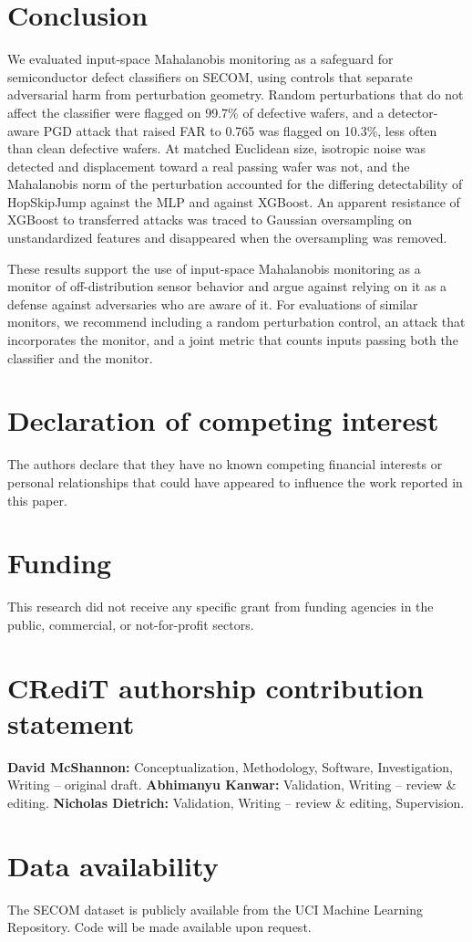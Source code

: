 \documentclass[preprint,12pt,authoryear]{elsarticle}
\begin{document}
\section{Conclusion}
We evaluated input-space Mahalanobis monitoring as a safeguard for semiconductor defect classifiers on SECOM, using controls that separate adversarial harm from perturbation geometry. Random perturbations that do not affect the classifier were flagged on 99.7\% of defective wafers, and a detector-aware PGD attack that raised FAR to 0.765 was flagged on 10.3\%, less often than clean defective wafers. At matched Euclidean size, isotropic noise was detected and displacement toward a real passing wafer was not, and the Mahalanobis norm of the perturbation accounted for the differing detectability of HopSkipJump against the MLP and against XGBoost. An apparent resistance of XGBoost to transferred attacks was traced to Gaussian oversampling on unstandardized features and disappeared when the oversampling was removed.

These results support the use of input-space Mahalanobis monitoring as a monitor of off-distribution sensor behavior and argue against relying on it as a defense against adversaries who are aware of it. For evaluations of similar monitors, we recommend including a random perturbation control, an attack that incorporates the monitor, and a joint metric that counts inputs passing both the classifier and the monitor.

\section*{Declaration of competing interest}
The authors declare that they have no known competing financial interests or personal relationships that could have appeared to influence the work reported in this paper.

\section*{Funding}
This research did not receive any specific grant from funding agencies in the public, commercial, or not-for-profit sectors.

\section*{CRediT authorship contribution statement}
\textbf{David McShannon:} Conceptualization, Methodology, Software, Investigation, Writing -- original draft. \textbf{Abhimanyu Kanwar:} Validation, Writing -- review \& editing. \textbf{Nicholas Dietrich:} Validation, Writing -- review \& editing, Supervision.

\section*{Data availability}
The SECOM dataset is publicly available from the UCI Machine Learning Repository. Code will be made available upon request.



\end{document}
